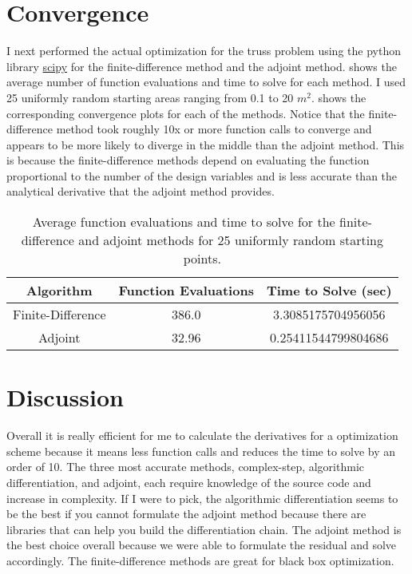 \documentclass{article}
\begin{document}
\section*{Convergence}

I next performed the actual optimization for the truss problem using the python library \href{https://docs.scipy.org/doc/scipy/reference/generated/scipy.optimize.minimize.html}{scipy} for the finite-difference method and the adjoint method.  shows the average number of function evaluations and time to solve for each method. I used 25 uniformly random starting areas ranging from 0.1 to 20 $m^2$.
 shows the corresponding convergence plots for each of the methods. Notice that the finite-difference method took roughly 10x or more function calls to converge and appears to be more likely to diverge in the middle than the adjoint method. This is because the finite-difference methods depend on evaluating the function proportional to the number of the design variables and is less accurate than the analytical derivative that the adjoint method provides. 

\begin{table}[htb]
	\centering
	\caption{Average function evaluations and time to solve for the finite-difference and adjoint methods for 25 uniformly random starting points.}
	\label{tab:c}
	\begin{tabular}{c|c|c}
		\toprule
		Algorithm & Function Evaluations & Time to Solve (sec) \\
		\midrule
		Finite-Difference & 386.0 & 3.3085175704956056\\
		Adjoint & 32.96 & 0.25411544799804686 \\
		\bottomrule
	\end{tabular}
\end{table}



\section*{Discussion}

Overall it is really efficient for me to calculate the derivatives for a optimization scheme because it means less function calls and reduces the time to solve by an order of 10. The three most accurate methods, complex-step, algorithmic differentiation, and adjoint, each require knowledge of the source code and increase in complexity. If I were to pick, the algorithmic differentiation seems to be the best if you cannot formulate the adjoint method because there are libraries that can help you build the differentiation chain. The adjoint method is the best choice overall because we were able to formulate the residual and solve accordingly. The finite-difference methods are great for black box optimization. 


%
%
\end{document}
